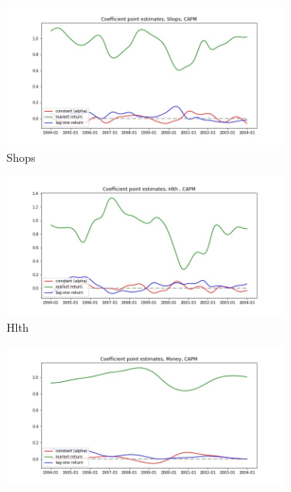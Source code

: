 \documentclass{article}
\begin{document}
\begin{figure}
  
  \begin{subfigure}[b]{0.5\textwidth}
    \centering
    \includegraphics[width=\textwidth]{Shops/coeffs_CAPM.jpg}
    \caption{Shops}
    \label{fig:2}
  \end{subfigure}
  \begin{subfigure}[b]{0.5\textwidth}
    \centering
    \includegraphics[width=\textwidth]{Hlth/coeffs_CAPM.jpg}
    \caption{Hlth}
    \label{fig:2}
  \end{subfigure}
  \begin{subfigure}[b]{0.5\textwidth}
    \centering
    \includegraphics[width=\textwidth]{Money/coeffs_CAPM.jpg}

\end{subfigure}
\end{figure}
\end{document}

